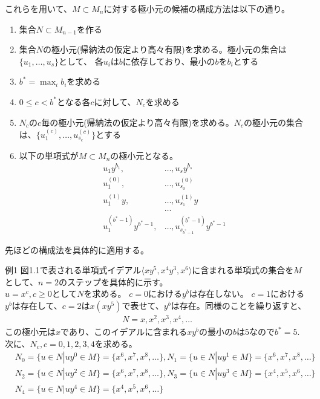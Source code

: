 \begin{frame}
	これらを用いて、$M \subset M_n$に対する極小元の候補の構成方法は以下の通り。
	\begin{enumerate}
		\item 集合$N \subset M_{n-1}$を作る
		\item 集合$N$の極小元(帰納法の仮定より高々有限)を求める。極小元の集合は$\{u_1, \ldots, u_s\}$として、
		      各$u_i$は$b$に依存しており、最小の$b$を$b_i$とする
		\item $b^* = \max_{i} b_i$を求める
		\item $0 \leq c < b^*$となる各$c$に対して、$N_c$を求める
		\item $N_c$の$c$毎の極小元(帰納法の仮定より高々有限)を求める。$N_c$の極小元の集合は、$\{u_1^{(c)}, \ldots, u_{s_c}^{(c)}\}$とする
		\item 以下の単項式が$M \subset M_n$の極小元となる。
		      \begin{align*}
			      u_1 y^{b_1},            & \ldots, u_s y^{b_s}                      \\
			      u_1^{(0)} ,             & \ldots, u_{s_0}^{(0)}                    \\
			      u_1^{(1)}y ,            & \ldots, u_{s_1}^{(1)}y                   \\
			                              & \ldots                                   \\
			      u_1^{(b^*-1)}y^{b^*-1}, & \ldots ,u_{s_{b^*-1}}^{(b^*-1)}y^{b^*-1}
		      \end{align*}
	\end{enumerate}
\end{frame}

\begin{frame}
	先ほどの構成法を具体的に適用する。
	\begin{exampleblock} {例1}
		図1.1で表される単項式イデアル$\langle xy^5, x^4y^3, x^6 \rangle$に含まれる単項式の集合を$M$として、$n=2$のステップを具体的に示す。\\
		$u=x^c, c \geq 0$として$N$を求める。
		$c=0$における$y^b$は存在しない。
		$c=1$における$y^b$は存在して、$c=2$は$x(xy^5)$で表せて、$y^b$は存在。同様のことを繰り返すと、
		\begin{align*}
			N = {x, x^2, x^3, x^4, \ldots}
		\end{align*}
		この極小元は$x$であり、このイデアルに含まれる$xy^b$の最小の$b$は$5$なので$b^*=5$. \\
		次に、$N_c, c=0,1,2,3,4$を求める。
		\begin{align*}
			 & N_0 = \{u \in N | uy^0 \in M\} = \{x^6, x^7, x^8, \ldots\} , N_1 = \{u \in N | uy^1 \in M\} = \{x^6, x^7, x^8, \ldots\} \\
			 & N_2 = \{u \in N | uy^2 \in M\} = \{x^6, x^7, x^8, \ldots\} , N_3 = \{u \in N | uy^3 \in M\} = \{x^4, x^5, x^6, \ldots\} \\
			 & N_4 = \{u \in N | uy^4 \in M\} = \{x^4, x^5, x^6, \ldots\}                                                              \\
		\end{align*}
	\end{exampleblock}
\end{frame}

